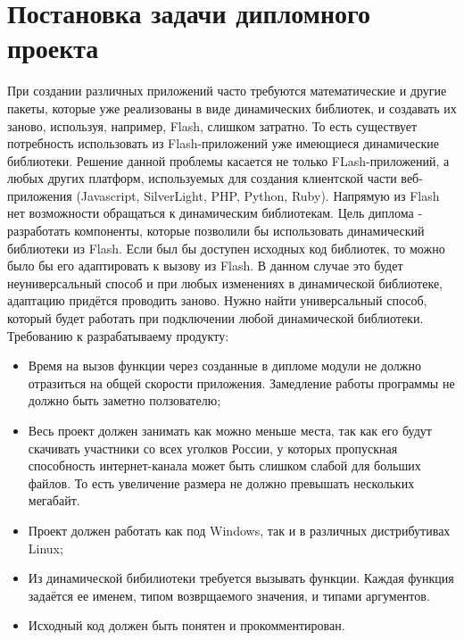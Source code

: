 \section{Постановка задачи дипломного проекта}
При создании различных приложений часто требуются математические и другие пакеты, которые уже реализованы в виде динамических библиотек, и создавать их заново, используя, например, Flash, слишком затратно. То есть существует потребность использовать из Flash-приложений уже имеющиеся динамические библиотеки. Решение данной проблемы касается не только FLash-приложений, а любых других платформ, используемых для создания клиентской части веб-приложения (Javascript, SilverLight, PHP, Python, Ruby).
Напрямую из Flash нет возможности обращаться к динамическим библиотекам. Цель диплома - разработать компоненты, которые позволили бы использовать динамический библиотеки из Flash.
Если был бы доступен исходных код библиотек, то можно было бы его адаптировать к вызову из Flash. В данном случае это будет неуниверсальный способ и при любых изменениях в динамической библиотеке, адаптацию придётся проводить заново. Нужно найти универсальный способ, который будет работать при подключении любой динамической библиотеки.
Требованию к разрабатываему продукту:
\begin{itemize}
  \item Время на вызов функции через созданные в дипломе модули не должно отразиться на общей скорости приложения. Замедление работы программы не должно быть заметно ползователю;
  \item Весь проект должен занимать как можно меньше места, так как его будут скачивать участники со всех уголков России, у которых пропускная способность интернет-канала может быть слишком слабой для больших файлов. То есть увеличение размера не должно превышать нескольких мегабайт.
  \item Проект должен работать как под Windows, так и в различных дистрибутивах Linux;
  \item Из динамической бибилиотеки требуется вызывать функции. Каждая функция задаётся ее именем, типом возврщаемого значения, и типами аргументов.
  \item Исходный код должен быть понятен и прокомментирован.
\end{itemize}